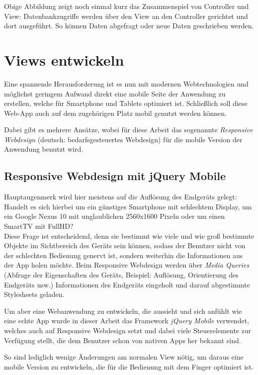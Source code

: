Obige Abbildung zeigt noch einmal kurz das Zusammenspiel von Controller und View: Datenbankzugriffe werden über den View an den Controller gerichtet und dort ausgeführt. So können Daten abgefragt oder neue Daten geschrieben werden.

\section{Views entwickeln}
Eine spannende Herausforderung ist es nun mit modernen Webtechnologien und möglichst geringem Aufwand direkt eine mobile Seite der Anwendung zu erstellen, welche für Smartphone und Tablets optimiert ist. Schließlich soll diese Web-App auch auf dem zugehörigen Platz mobil genutzt werden können.\par

Dabei gibt es mehrere Ansätze, wobei für diese Arbeit das sogenannte \emph{Responsive Webdesign} (deutsch: bedarfsgesteuertes Webdesign) für die mobile Version der Anwendung benutzt wird.

\subsection{Responsive Webdesign mit jQuery Mobile}
Hauptaugenmerk wird hier meistens auf die Auflösung des Endgeräts gelegt: Handelt es sich hierbei um ein günstiges Smartphone mit schlechtem Display, um ein Google Nexus 10 mit unglaublichen 2560x1600 Pixeln oder um einen SmartTV mit FullHD?\\
Diese Frage ist entscheidend, denn sie bestimmt wie viele und wie groß bestimmte Objekte im Sichtbereich des Geräts sein können, sodass der Benutzer nicht von der schlechten Bedienung genervt ist, sondern weiterhin die Informationen aus der App holen möchte. Beim Responsive Webdesign werden über \emph{Media Queries} (Abfrage der Eigenschaften des Geräts, Beispiel: Auflösung, Orientierung des Endgeräts usw.) Informationen des Endgeräts eingeholt und darauf abgestimmte Stylesheets geladen.\par

Um aber eine Webanwendung zu entwickeln, die aussieht und sich \glqq anfühlt\grqq{} wie eine echte App wurde in dieser Arbeit das Framework \emph{jQuery Mobile} verwendet, welches auch auf Responsive Webdesign setzt und dabei viele Steuerelemente zur Verfügung stellt, die dem Benutzer schon von nativen Apps her bekannt sind.\par

So sind lediglich wenige Änderungen am normalen View nötig, um daraus eine mobile Version zu entwickeln, die für die Bedienung mit dem Finger optimiert ist.